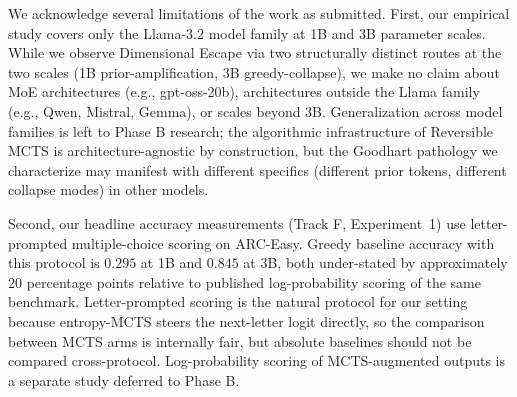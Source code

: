\documentclass{article}
\begin{document}
We acknowledge several limitations of the work as submitted. First, our empirical study covers only the Llama-3.2 model family at 1B and 3B parameter scales. While we observe Dimensional Escape via two structurally distinct routes at the two scales (1B prior-amplification, 3B greedy-collapse), we make no claim about MoE architectures (e.g., gpt-oss-20b), architectures outside the Llama family (e.g., Qwen, Mistral, Gemma), or scales beyond 3B. Generalization across model families is left to Phase B research; the algorithmic infrastructure of Reversible MCTS is architecture-agnostic by construction, but the Goodhart pathology we characterize may manifest with different specifics (different prior tokens, different collapse modes) in other models.

Second, our headline accuracy measurements (Track F, Experiment~1) use letter-prompted multiple-choice scoring on ARC-Easy. Greedy baseline accuracy with this protocol is $0.295$ at 1B and $0.845$ at 3B, both under-stated by approximately $20$ percentage points relative to published log-probability scoring of the same benchmark. Letter-prompted scoring is the natural protocol for our setting because entropy-MCTS steers the next-letter logit directly, so the comparison between MCTS arms is internally fair, but absolute baselines should not be compared cross-protocol. Log-probability scoring of MCTS-augmented outputs is a separate study deferred to Phase B.
\end{document}
